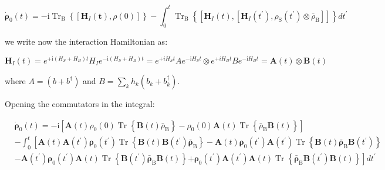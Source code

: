 \documentclass[%
preprint,
onecolumn,
notitlepag,
 amsmath,amssymb,
 aps,
 pra,
]{revtex4-2}
\begin{document}
\begin{equation}
 \dot{\boldsymbol{\rho}}_0(t)=-\mathrm{i} \operatorname{Tr}_{\mathrm{B}}\left\{\left[\boldsymbol{H}_{I}(\boldsymbol{t}), \rho(0)\right]\right\}-\int_{0}^{t} \operatorname{Tr}_{\mathrm{B}}\left\{\left[\boldsymbol{H}_{I}(t),\left[\boldsymbol{H}_{I}\left(t^{\prime}\right), \rho_{\mathrm{S}}\left(t^{\prime}\right) \otimes \bar{\rho}_{\mathrm{B}}\right]\right]\right\} d t^{\prime}
\end{equation}

we write now   the interaction Hamiltonian as: 

\begin{equation}
\boldsymbol{H}_{I}(t) =e^{+\mathrm{i}\left(H_{S}+H_{B}\right) t} H_{I} e^{-\mathrm{i}\left(H_{S}+H_{B}\right) t}= e^{+i H_{S} t} A e^{-\mathrm{i} H_{S} t} \otimes e^{+i H_{B} t} B e^{-\mathrm{i} H_{B} t} = \boldsymbol{A}(t) \otimes \boldsymbol{B}(t)
\end{equation}

where $A= \left( b + b ^{\dagger} \right) $ and $B= \sum_k h_k \left( b_k + b_k ^{\dagger} \right)$. 

Opening the commutators in the integral:


\begin{equation}\begin{aligned}
& \dot{\boldsymbol{\rho}}_0(t)=-\mathrm{i} \left[\boldsymbol{A}(t) \rho_0(0) \operatorname{Tr}\left\{ \boldsymbol{B}(t) \bar{\rho}_{\mathrm{B}}\right\}-\rho_0(0) \boldsymbol{A}(t) \operatorname{Tr}\left\{\bar{\rho}_{\mathrm{B}} \boldsymbol{B}(t)\right\}\right] \\
&- \int_{0}^{t}\left[\boldsymbol{A}(t)  \boldsymbol{A}\left(t^{\prime}\right) \boldsymbol{\rho_{\mathrm{0}}}\left(t^{\prime}\right) \operatorname{Tr}\left\{\boldsymbol{B}(t) \boldsymbol{B}\left(t^{\prime}\right) \bar{\boldsymbol{\rho}}_{\mathrm{B}}\right\}\right. -\boldsymbol{A}(t) \boldsymbol{\rho}_{\mathrm{0}}\left(t^{\prime}\right) \boldsymbol{A} \left(t^{\prime}\right) \operatorname{Tr}\left\{\boldsymbol{B}(t) \bar{\boldsymbol{\rho}}_{\mathrm{B}} \boldsymbol{B}\left(t^{\prime}\right)\right\} \\
& -\boldsymbol{A}\left(t^{\prime}\right) \boldsymbol{\rho}_{\mathrm{0}}\left(t^{\prime}\right) \boldsymbol{A}(t) \operatorname{Tr}\left\{\boldsymbol{B}\left(t^{\prime}\right) \bar{\boldsymbol{\rho}}_{\mathrm{B}} \boldsymbol{B}(t)\right\} 
\left.+\boldsymbol{\rho}_{\mathrm{0}}\left(t^{\prime}\right) \boldsymbol{A}\left(t^{\prime}\right) \boldsymbol{A}(t) \operatorname{Tr}\left\{\bar{\boldsymbol{\rho}}_{\mathrm{B}} \boldsymbol{B}\left(t^{\prime}\right) \boldsymbol{B}(t)\right\}\right] d t^{\prime}
\end{aligned}\end{equation}
\end{document}
